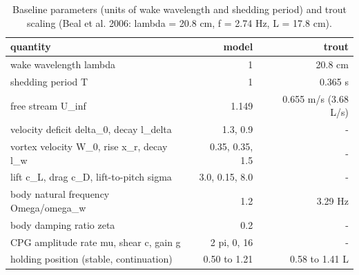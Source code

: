 \begin{table}
\caption{Baseline parameters (units of wake wavelength and shedding period) and trout scaling (Beal et al. 2006: lambda = 20.8 cm, f = 2.74 Hz, L = 17.8 cm).}
\label{tab:T1_parameters}
\begin{ruledtabular}
\begin{tabular}{lrr}
quantity & model & trout \\
\hline
wake wavelength lambda & 1 & 20.8 cm \\
shedding period T & 1 & 0.365 s \\
free stream U\_inf & 1.149 & 0.655 m/s (3.68 L/s) \\
velocity deficit delta\_0, decay l\_delta & 1.3, 0.9 & - \\
vortex velocity W\_0, rise x\_r, decay l\_w & 0.35, 0.35, 1.5 & - \\
lift c\_L, drag c\_D, lift-to-pitch sigma & 3.0, 0.15, 8.0 & - \\
body natural frequency Omega/omega\_w & 1.2 & 3.29 Hz \\
body damping ratio zeta & 0.2 & - \\
CPG amplitude rate mu, shear c, gain g & 2 pi, 0, 16 & - \\
holding position (stable, continuation) & 0.50 to 1.21 & 0.58 to 1.41 L \\
\end{tabular}
\end{ruledtabular}
\end{table}